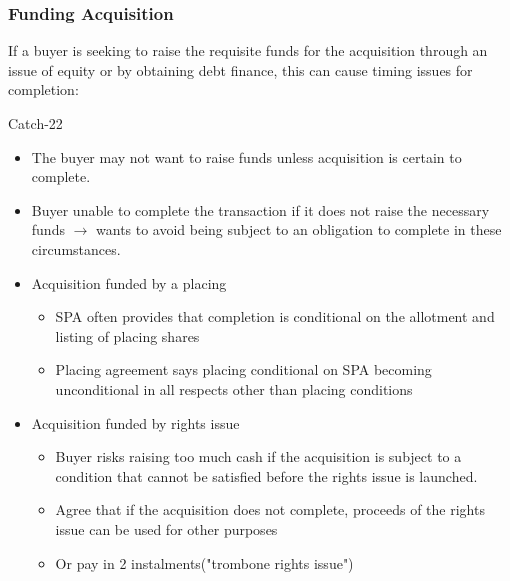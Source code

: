 \documentclass[
]{article}
\providecommand{\tightlist}{%
  \setlength{\itemsep}{0pt}\setlength{\parskip}{0pt}}
\newenvironment{env-48e9bfc8-c3dd-4504-a5fa-3b34b9a27ccf}
{
    \savenotes\tcolorbox[blanker,breakable,left=5pt,borderline west={2pt}{-4pt}{blue}]
}
{
    \endtcolorbox\spewnotes
}
\begin{document}
\hypertarget{funding-acquisition}{%
\subsubsection{Funding Acquisition}\label{funding-acquisition}}

If a buyer is seeking to raise the requisite funds for the acquisition
through an issue of equity or by obtaining debt finance, this can cause
timing issues for completion:

\begin{env-48e9bfc8-c3dd-4504-a5fa-3b34b9a27ccf}

Catch-22

\begin{itemize}
\tightlist
\item
  The buyer may not want to raise funds unless acquisition is certain to
  complete.
\item
  Buyer unable to complete the transaction if it does not raise the
  necessary funds {\(\rightarrow\)} wants to avoid being subject to an
  obligation to complete in these circumstances.
\end{itemize}

\end{env-48e9bfc8-c3dd-4504-a5fa-3b34b9a27ccf}

\begin{itemize}
\tightlist
\item
  Acquisition funded by a placing

  \begin{itemize}
  \tightlist
  \item
    SPA often provides that completion is conditional on the allotment
    and listing of placing shares
  \item
    Placing agreement says placing conditional on SPA becoming
    unconditional in all respects other than placing conditions
  \end{itemize}
\item
  Acquisition funded by rights issue

  \begin{itemize}
  \tightlist
  \item
    Buyer risks raising too much cash if the acquisition is subject to a
    condition that cannot be satisfied before the rights issue is
    launched.
  \item
    Agree that if the acquisition does not complete, proceeds of the
    rights issue can be used for other purposes
  \item
    Or pay in 2 instalments("trombone rights issue")
  \end{itemize}
\end{itemize}
\end{document}
